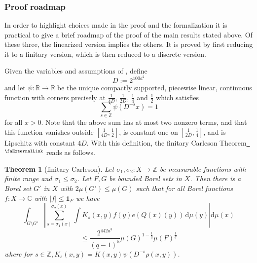 \documentclass[12pt]{amsart}
\newcommand*{\complex}{\mathbb{C}} %
\newcommand*{\real}{\mathbb{R}} %
\newcommand{\extlink}{~\ensuremath{{}^\text{\faExternalLink}}}
\theoremstyle{definition}
\theoremstyle{plain}
\newtheorem{theorem}{Theorem}[subsection]
\newcommand{\tQ}{{Q}}
\begin{document}
\subsubsection{Proof roadmap}\label{subsubsec:proof-sketch}

In order to highlight choices made in the proof and the formalization it is practical to give a brief roadmap
of the proof of the main results stated above.
Of these three, the linearized version  implies the others. It is proved by first reducing it to a finitary version, which is then reduced to a discrete version.

Given the variables and assumptions of , define
\[
D := 2^{100a^2}
\]
and let
$\psi\colon\real \to\real$ be the unique compactly supported, piecewise linear, continuous function with corners precisely at $\frac 1{4D}$, $\frac 1{2D}$, $\frac 14$ and $\frac 12$ which satisfies
\begin{equation}
    \sum_{s\in \mathbb{Z}} \psi(D^{-s}x)=1
\end{equation}
for all $x>0$. Note that the above sum has at most two nonzero terms, and that this function vanishes outside $[\frac1{4D},\frac 12]$, is constant one on
$[\frac1{2D},\frac 14]$, and is Lipschitz with constant $4D$. With this definition, the finitary Carleson Theorem\href{https://github.com/fpvandoorn/carleson/blob/3e96104fa4cd6d5ff37434ac39c49604c86a7658/Carleson/FinitaryCarleson.lean#L110}{\extlink} reads as follows.

\begin{theorem}[finitary Carleson]
\label{finitary-Carleson}
Let ${\sigma_1},\sigma_2\colon X\to \mathbb{Z}$ be measurable functions with finite range and ${\sigma_1}\leq \sigma_2$. Let $F,G$ be bounded Borel sets in $X$. Then there is a Borel set $G'$ in $X$ with $2\mu(G')\leq \mu(G)$ such that
for all Borel functions $f\colon X\to \complex$ with $|f|\le \mathbf{1}_F$ we have
\begin{equation*}
    \int_{G \setminus G'} \left|\sum_{s={\sigma_1}(x)}^{{\sigma_2}(x)} \int K_s(x,y) f(y) e(\tQ(x)(y)) \, \mathrm{d}\mu(y) \right| \mathrm{d}\mu(x)
\end{equation*}
\begin{equation}
    \le \frac{2^{442a^3}}{(q-1)^5} \mu(G)^{1-\frac{1}{q}} \mu(F)^{\frac 1 q}
\end{equation}
where for $s \in \mathbb{Z}, K_s(x,y) = K(x,y)\psi(D^{-s}\rho(x,y))$.
\end{theorem}
\end{document}
